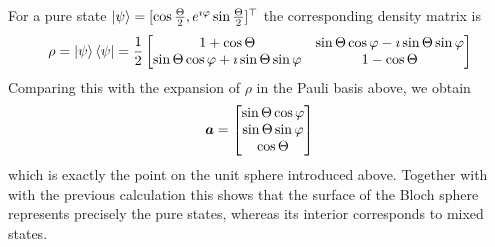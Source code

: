 For a pure state
\(
\ket{\psi}
=
[\cos\frac{\Theta}{2}, e^{\imath\varphi}\sin\frac{\Theta}{2}]^\top
\)
the corresponding density matrix is
\[
\rho
=
\ket{\psi}\bra{\psi}
=
\frac12
\begin{bmatrix}
1+\cos\Theta
&
\sin\Theta\cos\varphi-\imath\sin\Theta\sin\varphi
\\
\sin\Theta\cos\varphi+\imath\sin\Theta\sin\varphi
&
1-\cos\Theta
\end{bmatrix}
\]
Comparing this with
the expansion of $\rho$ in the Pauli basis above, we obtain
\[
{\boldsymbol{a}}
=
\begin{bmatrix}
\sin\Theta\cos\varphi\\
\sin\Theta\sin\varphi\\
\cos\Theta
\end{bmatrix}
\]
which is exactly the point on the unit sphere introduced above.
Together with
with the previous calculation
this shows that the surface of the Bloch sphere represents precisely the pure states, whereas its interior corresponds to mixed states.


